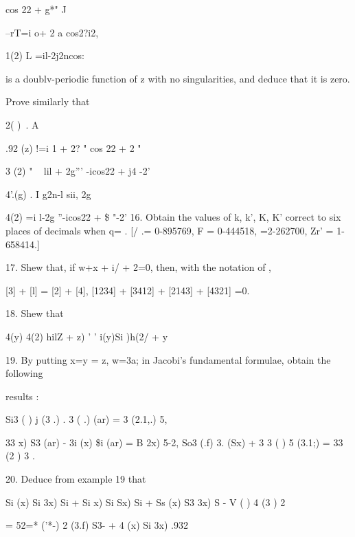 cos 22 + g*" J

 --rT=i o+ 2 a cos2?i2,

 1(2) L =il-2j2ncos:

is a doublv-periodic function of z with no singularities, and deduce
that it is zero.

Prove similarly that

 2( )\ . A%

.92 (z) !=i 1 + 2? " cos 22 + 2 "

 3 (2) " ~ lil + 2g''' -icos22 + j4 -2'

 4'.(g) . I g2n-l sii, 2g

  4(2) =i l-2g ''-icos22 + \$ "-2' 16. Obtain the values of k, k', K,
K' correct to six places of decimals when q= . [/ .= 0-895769, F =
0-444518, =2-262700, Zr' = 1-658414.]

%
%

17. Shew that, if w+x + i/ + 2=0, then, with the notation of ,

[3] + [l] = [2] + [4], [1234] + [3412] + [2143] + [4321] =0.

18. Shew that

 4(y) 4(2) hilZ + z) ' ' i(y)Si )h(2/ + y

19. By putting x=y = z, w=3a; in Jacobi's fundamental formulae, obtain
the following

results :

Si3 ( ) j (3 .) . 3 ( .) (ar) = 3 (2.1,.) 5,

 33 x) S3 (ar) - 3i (x) \$i (ar) = B 2x) 5-2, So3 (.f) 3. (Sx) + 3 3 (
) 5 (3.1;) = 33 (2 ) 3 .

20. Deduce from example 19 that

 Si (x) Si 3x) Si + Si x) Si Sx) Si + Ss (x) S3 3x) S - V ( ) 4 (3 ) 2

= 52=* ('*-) 2 (3.f) S3- + 4 (x) Si 3x) .932  

